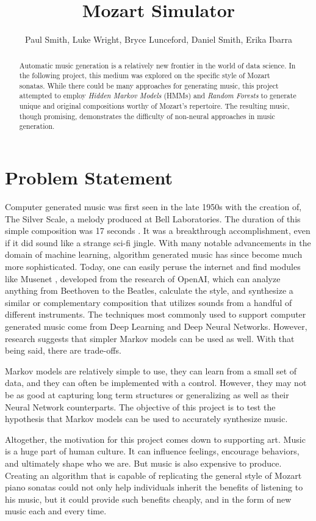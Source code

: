 \documentclass[11pt]{article}
\title{Mozart Simulator}
\author{Paul Smith, Luke Wright, Bryce Lunceford, Daniel Smith, Erika Ibarra}
\begin{document}
\maketitle
\begin{abstract}
Automatic music generation is a relatively new frontier in the world of data science. In the following project, this medium was explored on the specific style of Mozart sonatas. While there could be many approaches for generating music, this project attempted to employ \textit{Hidden Markov Models} (HMMs) and \textit{Random Forests} to generate unique and original compositions worthy of Mozart's repertoire. The resulting music, though promising, demonstrates the difficulty of non-neural approaches in music generation.
\end{abstract}

\section{Problem Statement}
Computer generated music was first seen in the late 1950s with the creation of, The Silver Scale, a melody produced at Bell Laboratories. The duration of this simple composition was 17 seconds \cite{Briot}. It was a breakthrough 
accomplishment, even if it did sound like a strange sci-fi jingle. With many notable advancements in the domain of machine learning, algorithm generated music has since become much more sophisticated. Today, one can easily peruse the internet and find modules like Musenet \cite{payne_2021}, developed from the research 
of OpenAI, which can analyze anything from Beethoven to the Beatles, calculate the style, and synthesize a similar or complementary composition that utilizes sounds from a handful of different instruments. The techniques most commonly used to support computer generated music come from Deep Learning and Deep Neural Networks. However, research suggests that simpler Markov models can be used as well. With that being said, there are trade-offs.

Markov models are relatively simple to use, they can learn from a small set of data, and they can often be implemented with a control. However, they may not be as good at capturing long term structures or generalizing as well as their Neural Network counterparts. The objective of this project is to test the hypothesis that Markov models can be used to accurately synthesize music.

Altogether, the motivation for this project comes down to supporting art. Music is a huge part of human culture. It can influence feelings, encourage behaviors, and ultimately shape who we are. But music is also expensive to produce. Creating an algorithm that is capable of replicating the general style of Mozart piano sonatas could not only help individuals inherit the benefits of listening to his music, but it could
provide such benefits cheaply, and in the form of new music each and every time. 
\end{document}
